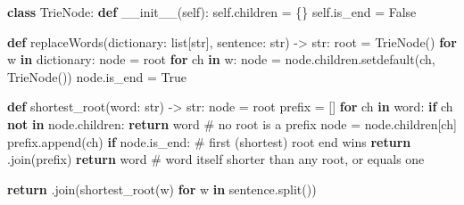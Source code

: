 \documentclass[11pt]{article}
\newenvironment{Shaded}{\begin{snugshade}}{\end{snugshade}}
\newcommand{\BuiltInTok}[1]{\textcolor[rgb]{0.50,0.55,0.55}{#1}}
\newcommand{\CommentTok}[1]{\textcolor[rgb]{0.48,0.49,0.49}{#1}}
\newcommand{\ControlFlowTok}[1]{\textcolor[rgb]{0.99,0.74,0.29}{\textbf{#1}}}
\newcommand{\FunctionTok}[1]{\textcolor[rgb]{0.56,0.27,0.68}{#1}}
\newcommand{\KeywordTok}[1]{\textcolor[rgb]{0.81,0.81,0.76}{\textbf{#1}}}
\newcommand{\NormalTok}[1]{\textcolor[rgb]{0.81,0.81,0.76}{#1}}
\newcommand{\OperatorTok}[1]{\textcolor[rgb]{0.81,0.81,0.76}{#1}}
\newcommand{\StringTok}[1]{\textcolor[rgb]{0.96,0.31,0.31}{#1}}
\newcommand{\VariableTok}[1]{\textcolor[rgb]{0.15,0.68,0.68}{#1}}
\begin{document}

\begin{Shaded}
\begin{Highlighting}[]
\KeywordTok{class}\NormalTok{ TrieNode:}
    \KeywordTok{def} \FunctionTok{\_\_init\_\_}\NormalTok{(}\VariableTok{self}\NormalTok{):}
        \VariableTok{self}\NormalTok{.children }\OperatorTok{=}\NormalTok{ \{\}}
        \VariableTok{self}\NormalTok{.is\_end }\OperatorTok{=} \VariableTok{False}

\KeywordTok{def}\NormalTok{ replaceWords(dictionary: }\BuiltInTok{list}\NormalTok{[}\BuiltInTok{str}\NormalTok{], sentence: }\BuiltInTok{str}\NormalTok{) }\OperatorTok{{-}\textgreater{}} \BuiltInTok{str}\NormalTok{:}
\NormalTok{    root }\OperatorTok{=}\NormalTok{ TrieNode()}
    \ControlFlowTok{for}\NormalTok{ w }\KeywordTok{in}\NormalTok{ dictionary:}
\NormalTok{        node }\OperatorTok{=}\NormalTok{ root}
        \ControlFlowTok{for}\NormalTok{ ch }\KeywordTok{in}\NormalTok{ w:}
\NormalTok{            node }\OperatorTok{=}\NormalTok{ node.children.setdefault(ch, TrieNode())}
\NormalTok{        node.is\_end }\OperatorTok{=} \VariableTok{True}

    \KeywordTok{def}\NormalTok{ shortest\_root(word: }\BuiltInTok{str}\NormalTok{) }\OperatorTok{{-}\textgreater{}} \BuiltInTok{str}\NormalTok{:}
\NormalTok{        node }\OperatorTok{=}\NormalTok{ root}
\NormalTok{        prefix }\OperatorTok{=}\NormalTok{ []}
        \ControlFlowTok{for}\NormalTok{ ch }\KeywordTok{in}\NormalTok{ word:}
            \ControlFlowTok{if}\NormalTok{ ch }\KeywordTok{not} \KeywordTok{in}\NormalTok{ node.children:}
                \ControlFlowTok{return}\NormalTok{ word          }\CommentTok{\# no root is a prefix}
\NormalTok{            node }\OperatorTok{=}\NormalTok{ node.children[ch]}
\NormalTok{            prefix.append(ch)}
            \ControlFlowTok{if}\NormalTok{ node.is\_end:          }\CommentTok{\# first (shortest) root end wins}
                \ControlFlowTok{return} \StringTok{\textquotesingle{}\textquotesingle{}}\NormalTok{.join(prefix)}
        \ControlFlowTok{return}\NormalTok{ word                  }\CommentTok{\# word itself shorter than any root, or equals one}

    \ControlFlowTok{return} \StringTok{\textquotesingle{} \textquotesingle{}}\NormalTok{.join(shortest\_root(w) }\ControlFlowTok{for}\NormalTok{ w }\KeywordTok{in}\NormalTok{ sentence.split())}
\end{Highlighting}
\end{Shaded}
\end{document}
